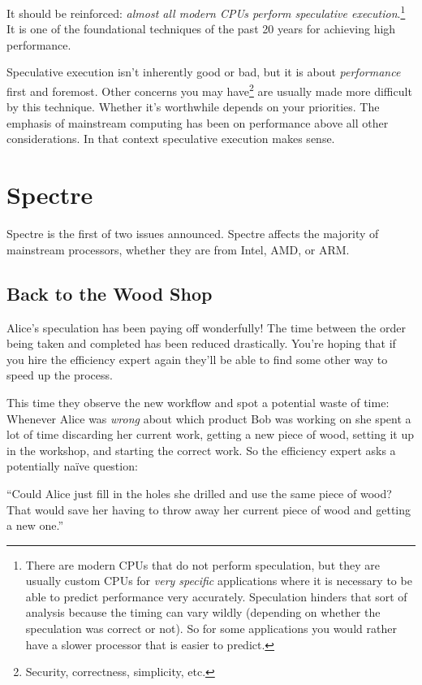 \documentclass{article}
\begin{document}
It should be reinforced: \emph{almost all modern CPUs perform speculative
execution}.\footnote{There are modern CPUs that do not perform speculation, but
they are usually custom CPUs for \emph{very specific} applications where it is
necessary to be able to predict performance very accurately. Speculation
hinders that sort of analysis because the timing can vary wildly (depending on
whether the speculation was correct or not). So for some applications you would
rather have a slower processor that is easier to predict.} It is one of the
foundational techniques of the past 20 years for achieving high performance.

Speculative execution isn't inherently good or bad, but it is about
\emph{performance} first and foremost. Other concerns you may
have\footnote{Security, correctness, simplicity, etc.} are usually made more
difficult by this technique. Whether it's worthwhile depends on your
priorities. The emphasis of mainstream computing has been on performance above
all other considerations. In that context speculative execution makes sense.

\section{Spectre}

Spectre is the first of two issues announced. Spectre affects the majority of
mainstream processors, whether they are from Intel, AMD, or ARM.

\subsection*{Back to the Wood Shop}

Alice's speculation has been paying off wonderfully! The time between the order
being taken and completed has been reduced drastically. You're hoping that if
you hire the efficiency expert again they'll be able to find some other way to
speed up the process.

This time they observe the new workflow and spot a potential waste of time:
Whenever Alice was \emph{wrong} about which product Bob was working on she
spent a lot of time discarding her current work, getting a new piece of wood,
setting it up in the workshop, and starting the correct work. So the efficiency
expert asks a potentially na\"{i}ve question:

``Could Alice just fill in the holes she drilled and use the same piece of
wood? That would save her having to throw away her current piece of wood and
getting a new one.''
\end{document}
